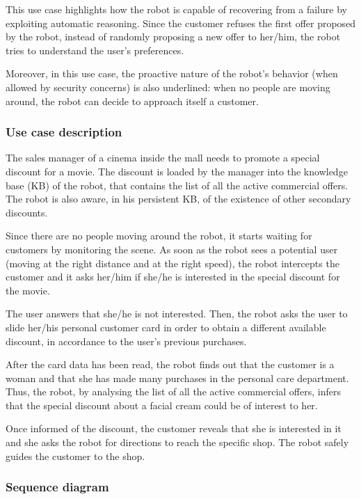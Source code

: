 This use case highlights how the robot is capable of
recovering from a failure by exploiting automatic reasoning.
Since the customer refuses the first offer proposed by the robot, instead of randomly proposing a new offer to her/him, the robot tries to understand the user's preferences.

Moreover, in this use case, the proactive nature of the robot's behavior (when allowed by security concerns) is also underlined: when no people are
moving around, the robot can decide to approach itself a customer.

\subsubsection{Use case description}

The sales manager of a cinema inside the mall needs to promote a special discount
for a movie. The discount is loaded by the manager into the 
knowledge base (KB) of the robot, that contains the list of all the active commercial offers.
The robot is also aware, in his persistent KB, of the
existence of other secondary discounts.

Since there are no people moving around the robot, it starts
waiting for customers by monitoring the scene. As soon as the robot
sees a potential user (moving at the right distance and at the right speed),
the robot intercepts the customer and it asks her/him if she/he is interested
in the special discount for the movie.

The user answers that she/he is not interested.
Then, the robot asks the user to slide her/his personal customer card in order to
obtain a different available discount, in accordance to the user's previous purchases.

After the card data has been read, the robot finds out that the customer is a woman and that she
has made many purchases in the personal care department. 
Thus, the robot, by analysing the list of all the active commercial offers,
infers that the special discount about a facial cream could be of interest
to her.

Once informed of the discount, the customer reveals
that she is interested in it and she asks the robot for directions to reach the specific
shop. The robot safely guides the customer to the shop.

\newpage

\subsubsection{Sequence diagram}

